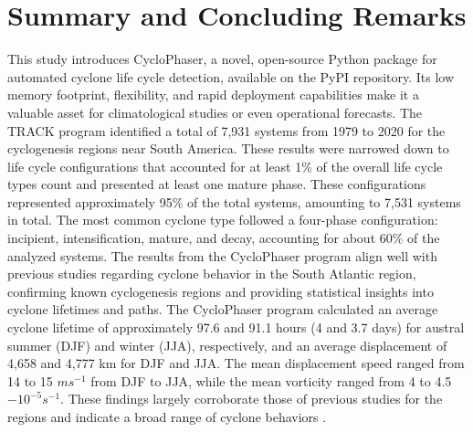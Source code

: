 \section{Summary and Concluding Remarks}

This study introduces CycloPhaser, a novel, open-source Python package for automated cyclone life cycle detection, available on the PyPI repository. Its low memory footprint, flexibility, and rapid deployment capabilities make it a valuable asset for climatological studies or even operational forecasts. The TRACK program identified a total of 7,931 systems from 1979 to 2020 for the cyclogenesis regions near South America. These results were narrowed down to life cycle configurations that accounted for at least 1\% of the overall life cycle types count and presented at least one mature phase. These configurations represented approximately 95\% of the total systems, amounting to 7,531 systems in total. The most common cyclone type followed a four-phase configuration: incipient, intensification, mature, and decay, accounting for about 60\% of the analyzed systems. The results from the CycloPhaser program align well with previous studies regarding cyclone behavior in the South Atlantic region, confirming known cyclogenesis regions and providing statistical insights into cyclone lifetimes and paths. The CycloPhaser program calculated an average cyclone lifetime of approximately 97.6 and 91.1 hours (4 and 3.7 days) for austral summer (DJF) and winter (JJA), respectively, and an average displacement of 4,658 and 4,777 km for DJF and JJA. The mean displacement speed ranged from 14 to 15 \(m s^{-1}\) from DJF to JJA, while the mean vorticity ranged from 4 to 4.5 \(-10^{-5} s^{-1}\). These findings largely corroborate those of previous studies for the regions and indicate a broad range of cyclone behaviors \citep{simmonds1999southern, hoskins2005new, mendes2010climatology, reboita2010regimes, gramcianinov2019properties, gramcianinov2020analysis, crespo2023assessment}.

